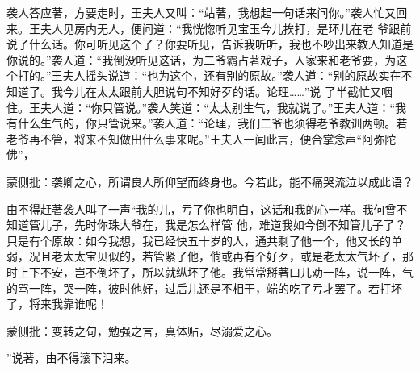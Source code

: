 \begin{parag}
    袭人答应著，方要走时，王夫人又叫：“站著，我想起一句话来问你。”袭人忙又回来。王夫人见房内无人，便问道：“我恍惚听见宝玉今儿挨打，是环儿在老 爷跟前说了什么话。你可听见这个了？你要听见，告诉我听听，我也不吵出来教人知道是你说的。”袭人道：“我倒没听见这话，为二爷霸占著戏子，人家来和老爷要，为这个打的。”王夫人摇头说道：“也为这个，还有别的原故。”袭人道：“别的原故实在不知道了。我今儿在太太跟前大胆说句不知好歹的话。论理……”说 了半截忙又咽住。王夫人道：“你只管说。”袭人笑道：“太太别生气，我就说了。”王夫人道：“我有什么生气的，你只管说来。”袭人道：“论理，我们二爷也须得老爷教训两顿。若老爷再不管，将来不知做出什么事来呢。”王夫人一闻此言，便合掌念声“阿弥陀佛”，\begin{note}蒙侧批：袭卿之心，所谓良人所仰望而终身也。今若此，能不痛哭流泣以成此语？\end{note}由不得赶著袭人叫了一声“我的儿，亏了你也明白，这话和我的心一样。我何曾不知道管儿子，先时你珠大爷在，我是怎么样管 他，难道我如今倒不知管儿子了？只是有个原故：如今我想，我已经快五十岁的人，通共剩了他一个，他又长的单弱，况且老太太宝贝似的，若管紧了他，倘或再有个好歹，或是老太太气坏了，那时上下不安，岂不倒坏了，所以就纵坏了他。我常常掰著口儿劝一阵，说一阵，气的骂一阵，哭一阵，彼时他好，过后儿还是不相干，端的吃了亏才罢了。若打坏了，将来我靠谁呢！\begin{note}蒙侧批：变转之句，勉强之言，真体贴，尽溺爱之心。\end{note}”说著，由不得滚下泪来。
\end{parag}


